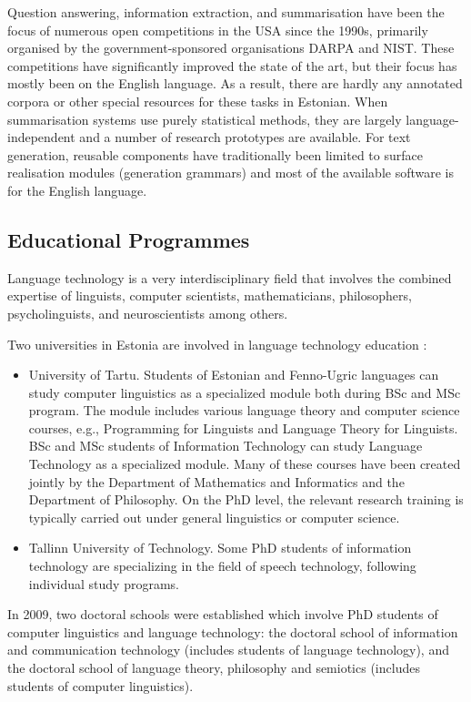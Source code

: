 \begin{multicols}{2}
Question answering, information extraction, and summarisation have been the focus of numerous open competitions in the USA since the 1990s, primarily organised by the government-sponsored organisations DARPA and NIST. These competitions have significantly improved the state of the art, but their focus has mostly been on the English language. As a result, there are hardly any annotated corpora or other special resources for these tasks in Estonian. When summarisation systems use purely statistical methods, they are largely language-independent and a number of research prototypes are available. For text generation, reusable components have traditionally been limited to surface realisation modules (generation grammars) and most of the available software is for the English language. 

\subsection{Educational Programmes}

Language technology is a very interdisciplinary field that involves the combined expertise of linguists, computer scientists, mathematicians, philosophers, psycholinguists, and neuroscientists among others. 

Two universities in Estonia are involved in language technology education \cite{Meisteretal}: 
\begin{itemize}
 \item University of Tartu. Students of Estonian and Fenno-Ugric languages can study computer linguistics as a specialized module both during BSc and MSc program. The module includes various language theory and computer science courses, e.g., Programming for Linguists and Language Theory for Linguists. BSc and MSc students of Information Technology can study Language Technology as a specialized module. Many of these courses have been created jointly by the Department of Mathematics and Informatics and the Department of Philosophy. On the PhD level, the relevant research training is typically carried out under general linguistics or computer science.
\item  Tallinn University of Technology. Some PhD students of information technology are specializing in the field of speech technology, following individual study programs.
\end{itemize}

In 2009, two doctoral schools were established which involve PhD students of computer linguistics and language technology: the doctoral school of information and communication technology (includes students of language technology), and the doctoral school of language theory, philosophy and semiotics (includes students of computer linguistics).



\end{multicols}
